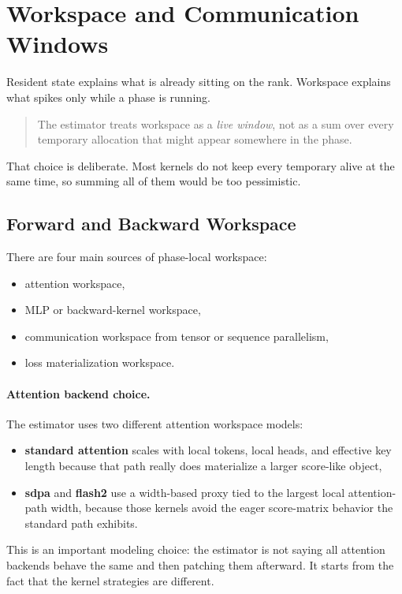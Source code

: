 \section{Workspace and Communication Windows}
Resident state explains what is already sitting on the rank. Workspace explains
what spikes only while a phase is running.

\begin{quote}
The estimator treats workspace as a \emph{live window}, not as a sum over every
temporary allocation that might appear somewhere in the phase.
\end{quote}

That choice is deliberate. Most kernels do not keep every temporary alive at
the same time, so summing all of them would be too pessimistic.

\subsection{Forward and Backward Workspace}
There are four main sources of phase-local workspace:
\begin{itemize}[leftmargin=1.5em]
\item attention workspace,
\item MLP or backward-kernel workspace,
\item communication workspace from tensor or sequence parallelism,
\item loss materialization workspace.
\end{itemize}

\paragraph{Attention backend choice.}
The estimator uses two different attention workspace models:
\begin{itemize}[leftmargin=1.5em]
\item \textbf{standard attention} scales with local tokens, local heads, and
effective key length because that path really does materialize a larger
score-like object,
\item \textbf{sdpa} and \textbf{flash2} use a width-based proxy tied to the
largest local attention-path width, because those kernels avoid the eager
score-matrix behavior the standard path exhibits.
\end{itemize}

This is an important modeling choice: the estimator is not saying all attention
backends behave the same and then patching them afterward. It starts from the
fact that the kernel strategies are different.

